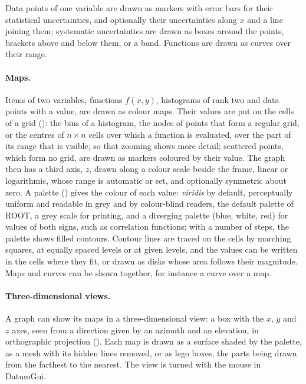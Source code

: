 Data points of one variable are drawn as markers with error bars for their statistical uncertainties, and
optionally their uncertainties along $x$ and a line joining them; systematic uncertainties are drawn as boxes around
the points, brackets above and below them, or a band. Functions are drawn as curves over their range.

\paragraph{Maps.}
Items of two variables, functions $f(x,y)$, histograms of rank two and data points with a value, are drawn as colour
maps. Their values are put on the cells of a grid (): the bins of a histogram, the nodes of points that
form a regular grid, or the centres of $n \times n$ cells over which a function is evaluated, over the part of its
range that is visible, so that zooming shows more detail; scattered points, which form no grid, are drawn as markers
coloured by their value. The graph then has a third axis, $z$, drawn along a colour scale beside the frame, linear or
logarithmic, whose range is automatic or set, and optionally symmetric about zero. A palette () gives
the colour of each value: \emph{viridis} by default, perceptually uniform and readable in grey and by colour-blind
readers, the default palette of ROOT, a grey scale for printing, and a diverging palette (blue, white, red) for
values of both signs, such as correlation functions; with a number of steps, the palette shows filled contours.
Contour lines are traced on the cells by marching squares, at equally spaced levels or at given levels, and the values
can be written in the cells where they fit, or drawn as disks whose area follows their magnitude. Maps and curves can
be shown together, for instance a curve over a map.

\paragraph{Three-dimensional views.}
A graph can show its maps in a three-dimensional view: a box with the $x$, $y$ and $z$ axes, seen from a direction
given by an azimuth and an elevation, in orthographic projection (). Each map is drawn as a surface
shaded by the palette, as a mesh with its hidden lines removed, or as lego boxes, the parts being drawn from the
farthest to the nearest. The view is turned with the mouse in DatumGui.

